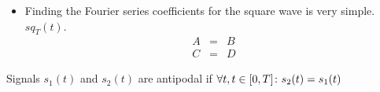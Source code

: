 \documentclass[letterpaper]{cnx}
\begin{document}
\begin{cnxmodule}[name=Fourier Series,id=m0039]
\begin{ccontent}
    \begin{cexample}[id=squarewave-two]
      \begin{itemize}
	\item Finding the Fourier series coefficients for the square wave is very
        simple. $sq_T(t)$.
        \begin{eqnarray*}
          A&=&B\\
          C& = & D
        \end{eqnarray*}
      \end{itemize}
    \end{cexample}
    
    \begin{definition}[id=antipodef,term=antipodal]
      \begin{cmeaning}
        Signals $s_1(t)$ and $s_2(t)$ are antipodal if
        $\forall{t},{t\in{[0,T]}}\colon{s_2(t)=s_1(t)}$
    \end{cmeaning}
  \end{definition}
  \end{ccontent}
\end{cnxmodule}
\end{document}

